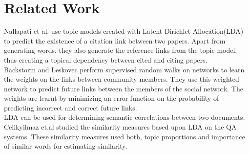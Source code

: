 \documentclass{article} %
\begin{document}
\section{Related Work}
	Nallapati et al. \cite{nallapati2008joint} use topic models created with Latent Dirichlet Allocation(LDA) \cite{blei2003latent} to predict the existence of a citation link between two papers. Apart from generating words, they also generate the reference links from the topic model, thus creating a topical dependency between cited and citing papers. \\
Backstorm and Leskovec \cite{Backstrom:2011:SRW:1935826.1935914} perform supervised random walks on networks to learn the weights on the links between community members. They use this weighted network to predict future links between the members of the social network. The weights are learnt by minimizing an error function on the probability of predicting incorrect and correct future links. \\
	LDA can be used for determining semantic correlations between two documents. Celikyilmaz et.al studied the similarity measures based upon LDA on the QA systems. These similarity measures used both, topic proportions and importance of similar words for estimating similarity.
\end{document}
